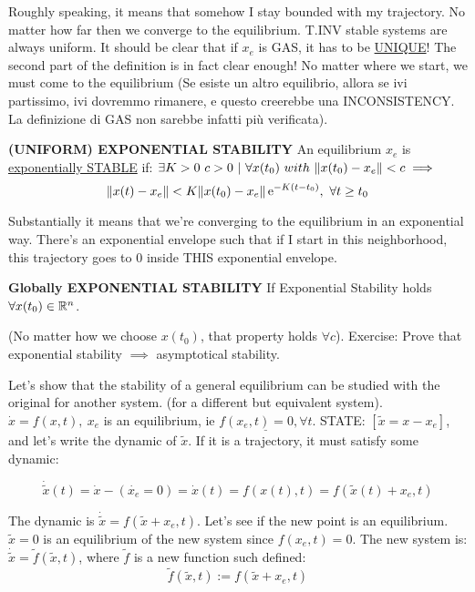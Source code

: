 Roughly speaking, it means that somehow I stay bounded with my trajectory. No matter how far then we converge to the equilibrium. T.INV stable systems are always uniform. It should be clear that if $x_e$ is GAS, it has to be \underline{UNIQUE}! The second part of the definition is in fact clear enough! No matter where we start, we must come to the equilibrium (Se esiste un altro equilibrio, allora se ivi partissimo, ivi dovremmo rimanere, e questo creerebbe una INCONSISTENCY. La definizione di GAS non sarebbe infatti più verificata).

\begin{defn}{\textbf{(UNIFORM) EXPONENTIAL STABILITY}} \newline
An equilibrium $x_e$ is \underline{exponentially STABLE} if: $\exists K > 0\ c > 0\ |\ \forall x(t_0)\ with\ \lVert x(t_0) - x_e\rVert < c \implies$
\[
	\lVert x(t) - x_e\rVert < K\lVert x(t_0)-x_e\rVert\mathop{}\!\mathrm{e}^{-K(t-t_0)},\ \forall t \geq t_0
\]
\end{defn}

Substantially it means that we're converging to the equilibrium in an exponential way. There's an exponential envelope such that if I start in this neighborhood, this trajectory goes to 0 inside THIS exponential envelope.

\begin{defn}{\textbf{Globally EXPONENTIAL STABILITY}} \newline
If Exponential Stability holds $\forall x(t_0) \in \mathbb{R}^n$.
\end{defn}

(No matter how we choose $x(t_0)$, that property holds $\forall c $).
Exercise: Prove that exponential stability $\implies$ asymptotical stability.

Let's show that the stability of a general equilibrium can be studied with the original for another system. (for a different but equivalent system). $\dot{x}=f(x,t),\ x_e$ is an equilibrium, ie $\underline{f(x_e,t)=0, \forall t}$.
STATE: $[\tilde{x} = x-x_e]$, and let's write the dynamic of $\tilde{x}$. If it is a trajectory, it must satisfy some dynamic:

\[
	\dot{\tilde{x}}(t) = \dot{x} - (\dot{x_e}=0) = \dot{x}(t) = f(x(t),t) = f(\tilde{x}(t)+x_e,t)
\]

The dynamic is $\dot{\tilde{x}} = f(\tilde{x}+x_e,t)$. Let's see if the new point is an equilibrium. $\tilde{x}=0$ is an equilibrium of the new system since $f(x_e,t) = 0$. The new system is: $\dot{\tilde{x}}=\tilde{f}(\tilde{x},t)$, where $\tilde{f}$ is a new function such defined:
\[
	\tilde{f}(\tilde{x},t) := f(\tilde{x}+x_e,t)
\]

